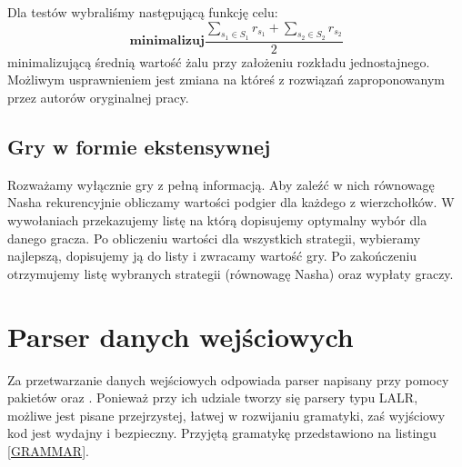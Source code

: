 \documentclass[polish]{standalone}
\begin{document}
Dla testów wybraliśmy następującą funkcję celu:
$$\textbf{minimalizuj} \frac{\sum_{s_1 \in S_1} r_{s_1} + \sum_{s_2 \in S_2} r_{s_2}}{2}$$
minimalizującą średnią wartość żalu przy założeniu rozkładu jednostajnego. Możliwym usprawnieniem jest zmiana na któreś
z rozwiązań zaproponowanym przez autorów oryginalnej pracy.

\subsection{Gry w formie ekstensywnej}

Rozważamy wyłącznie gry z pełną informacją. Aby zaleźć w nich równowagę Nasha rekurencyjnie obliczamy wartości
podgier dla każdego z wierzchołków. W wywołaniach przekazujemy listę na którą dopisujemy optymalny wybór dla danego
gracza. Po obliczeniu wartości dla wszystkich strategii, wybieramy najlepszą, dopisujemy ją do listy i zwracamy wartość
gry. Po zakończeniu otrzymujemy listę wybranych strategii (równowagę Nasha) oraz wypłaty graczy.

\section{Parser danych wejściowych}

Za przetwarzanie danych wejściowych odpowiada parser napisany przy pomocy pakietów  oraz . Ponieważ
przy ich udziale tworzy się parsery typu LALR, możliwe jest pisane przejrzystej, łatwej w rozwijaniu gramatyki, zaś 
wyjściowy kod jest wydajny i bezpieczny. Przyjętą gramatykę przedstawiono na listingu \ref{GRAMMAR}.
\end{document}
